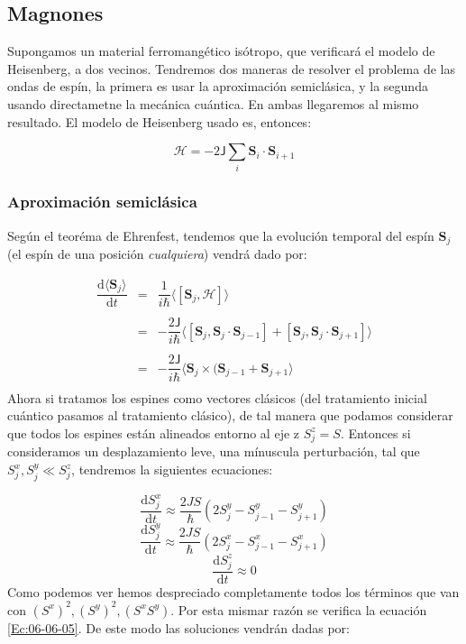 \documentclass[12pt,a4paper]{book}
\numberwithin{equation}{section}
\numberwithin{figure}{section}
\newcommand{\parentesis}[1]{\left( #1  \right)}
\newcommand{\ccorchetes}[1]{\left[ #1  \right]}
\newcommand{\D}{\mathrm{d}}
\newcommand{\derivadas}[2]{\frac{\D #1}{\D #2}}
\newcommand{\Hcal}{\mathcal{H}}
\newcommand{\Jsf}{\mathsf{J}}
\newcommand{\Sn}{\mathbf{S}}
\begin{document}
\subsection{Magnones}

Supongamos un material ferromangético isótropo, que verificará el modelo de Heisenberg, a dos vecinos. Tendremos dos maneras de resolver el problema de las ondas de espín, la primera es usar la aproximación semiclásica, y la segunda usando directametne la mecánica cuántica. En ambas llegaremos al mismo resultado. El modelo de Heisenberg usado es, entonces:

\begin{equation}
    \Hcal = - 2 \Jsf \sum_i \Sn_i \cdot \Sn_{i+1}
\end{equation}

\subsubsection{Aproximación semiclásica}

Según el teoréma de Ehrenfest, tendemos que la evolución temporal del espín $\Sn_j$ (el espín de una posición \textit{cualquiera}) vendrá dado por:

\begin{equation}\begin{array}{lll}
    \dfrac{\D \langle \Sn_j \rangle}{\D t}  & = & \dfrac{1}{i \hbar} \langle \ccorchetes{\Sn_j , \Hcal} \rangle  \\ \\ & = & - \dfrac{2\Jsf}{i \hbar} \langle \ccorchetes{\Sn_j,\Sn_j \cdot \Sn_{j-1}} + \ccorchetes{\Sn_j, \Sn_j \cdot \Sn_{j+1}} \rangle \\ \\
     & = &  - \dfrac{2\Jsf}{i \hbar} \langle \Sn_j \times (\Sn_{j-1}+ \Sn_{j+1} \rangle \\
\end{array}
\end{equation}
Ahora si tratamos los espines como vectores clásicos (del tratamiento inicial cuántico pasamos al tratamiento clásico), de tal manera que podamos considerar que todos los espines están alineados entorno al eje z $S_j^z = S$. Entonces si consideramos un desplazamiento leve, una mínuscula perturbación, tal que $S_j^x,S_j^y \ll S_j^z$, tendremos la siguientes ecuaciones:

\begin{equation}
    \derivadas{S^x_j}{t} \approx \frac{2JS}{\hbar} \parentesis{2S_j^y-S_{j-1}^y-S_{j+1}^y}
\end{equation}
\begin{equation}
    \derivadas{S^y_j}{t} \approx \frac{2JS}{\hbar} \parentesis{2S_j^x-S_{j-1}^x-S_{j+1}^x}
\end{equation}
\begin{equation}
    \derivadas{S^z_j}{t} \approx 0 \label{Ec:06-06-05}
\end{equation}
Como podemos ver hemos despreciado completamente todos los términos que van con $(S^x)^2,(S^y)^2,(S^xS^y)$. Por esta mismar razón se verifica la ecuación \ref{Ec:06-06-05}. De este modo las soluciones vendrán dadas por:
\end{document}
